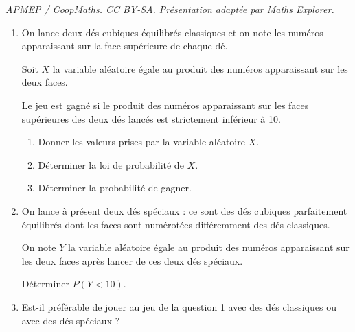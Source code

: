 \documentclass[10pt]{article}
\begin{document}
\noindent\textit{APMEP / CoopMaths. CC BY-SA. Présentation adaptée par Maths Explorer.}\par\medskip
\bigskip

\begin{enumerate}
\item On lance deux dés cubiques équilibrés \og classiques \fg{} et on note les numéros apparaissant sur la face supérieure de chaque dé.

Soit $X$ la variable aléatoire égale au produit des numéros apparaissant sur les deux faces.

Le jeu est gagné si le produit des numéros apparaissant sur les faces supérieures des deux
dés lancés est strictement inférieur à 10.

\medskip

\begin{enumerate}
\item Donner les valeurs prises par la variable aléatoire $X$.
\item Déterminer la loi de probabilité de  $X$.
\item Déterminer la probabilité de gagner.
\end{enumerate}

\item On lance à présent deux dés spéciaux : ce sont des dés cubiques parfaitement équilibrés dont les faces sont numérotées différemment des dés classiques.


On note $Y$ la variable aléatoire égale au produit des numéros apparaissant sur les deux faces après lancer de ces deux dés spéciaux.

Déterminer $P(Y < 10)$.

\item Est-il préférable de jouer au jeu de la question 1 avec des dés classiques ou avec des dés
spéciaux ?
\end{enumerate}

\vspace{0.5cm}
\end{document}
